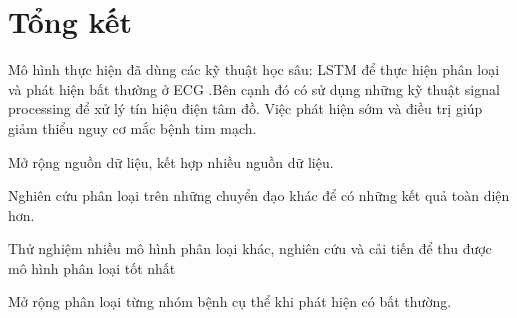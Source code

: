 \chapter{Tổng kết}

Mô hình thực hiện đã dùng các kỹ thuật học sâu: LSTM để thực hiện phân loại và phát hiện bất thường ở ECG .Bên cạnh đó có sử dụng những kỹ thuật signal processing để xử lý tín hiệu điện tâm đồ. Việc phát hiện sớm và điều trị giúp giảm thiểu nguy cơ mắc bệnh tim mạch.

Mở rộng nguồn dữ liệu, kết hợp nhiều nguồn dữ liệu.

Nghiên cứu phân loại trên những chuyển đạo khác để có những kết quả toàn diện hơn.

Thử nghiệm nhiều mô hình phân loại khác, nghiên cứu và cải tiến để thu được mô hình phân loại tốt nhất

Mở rộng phân loại từng nhóm bệnh cụ thể khi phát hiện có bất thường.